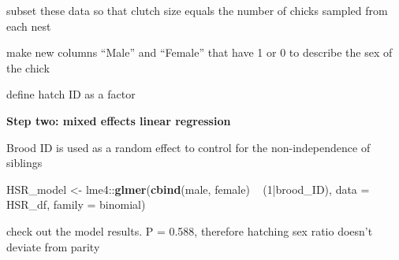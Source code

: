 \documentclass[]{article}
\newenvironment{Shaded}{\begin{snugshade}}{\end{snugshade}}
\newcommand{\KeywordTok}[1]{\textcolor[rgb]{0.13,0.29,0.53}{\textbf{{#1}}}}
\newcommand{\DataTypeTok}[1]{\textcolor[rgb]{0.13,0.29,0.53}{{#1}}}
\newcommand{\DecValTok}[1]{\textcolor[rgb]{0.00,0.00,0.81}{{#1}}}
\newcommand{\StringTok}[1]{\textcolor[rgb]{0.31,0.60,0.02}{{#1}}}
\newcommand{\NormalTok}[1]{{#1}}
\begin{document}
subset these data so that clutch size equals the number of chicks
sampled from each nest

\begin{Shaded}
\end{Shaded}

make new columns ``Male'' and ``Female'' that have 1 or 0 to describe
the sex of the chick

\begin{Shaded}
\end{Shaded}

define hatch ID as a factor

\begin{Shaded}
\end{Shaded}

\textbf{Step two: mixed effects linear regression}

Brood ID is used as a random effect to control for the non-independence
of siblings

\begin{Shaded}
\begin{Highlighting}[]
\NormalTok{HSR_model <-}\StringTok{ }\NormalTok{lme4::}\KeywordTok{glmer}\NormalTok{(}\KeywordTok{cbind}\NormalTok{(male, female) ~}\StringTok{ }\NormalTok{(}\DecValTok{1}\NormalTok{|brood_ID),}
                     \DataTypeTok{data =} \NormalTok{HSR_df, }\DataTypeTok{family =} \NormalTok{binomial)}
\end{Highlighting}
\end{Shaded}

check out the model results. P = 0.588, therefore hatching sex ratio
doesn't deviate from parity
\end{document}
